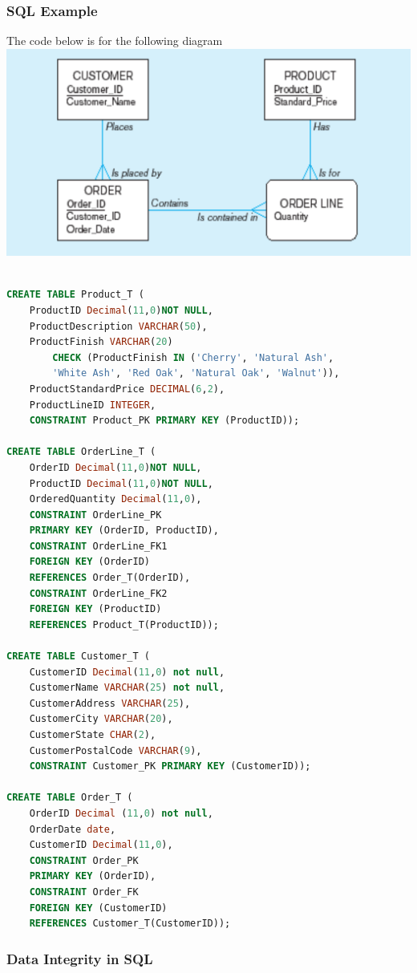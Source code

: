 \documentclass[12pt]{article}
\begin{document}
\subsubsection{SQL Example}

The code below is for the following diagram\\
\includegraphics[scale=0.55]{lec7-1}

\begin{lstlisting}[language=SQL]

CREATE TABLE Product_T (
	ProductID Decimal(11,0)NOT NULL, 
	ProductDescription VARCHAR(50), 
	ProductFinish VARCHAR(20)
		CHECK (ProductFinish IN ('Cherry', 'Natural Ash',
		'White Ash', 'Red Oak', 'Natural Oak', 'Walnut')),
	ProductStandardPrice DECIMAL(6,2), 
	ProductLineID INTEGER,
	CONSTRAINT Product_PK PRIMARY KEY (ProductID));

CREATE TABLE OrderLine_T (
	OrderID Decimal(11,0)NOT NULL, 
	ProductID Decimal(11,0)NOT NULL, 
	OrderedQuantity Decimal(11,0),
 	CONSTRAINT OrderLine_PK 
	PRIMARY KEY (OrderID, ProductID),
	CONSTRAINT OrderLine_FK1 
	FOREIGN KEY (OrderID) 
	REFERENCES Order_T(OrderID),
	CONSTRAINT OrderLine_FK2 
	FOREIGN KEY (ProductID) 
	REFERENCES Product_T(ProductID));

CREATE TABLE Customer_T (
	CustomerID Decimal(11,0) not null,
	CustomerName VARCHAR(25) not null, 
	CustomerAddress VARCHAR(25), 
	CustomerCity VARCHAR(20), 
	CustomerState CHAR(2), 
	CustomerPostalCode VARCHAR(9),
	CONSTRAINT Customer_PK PRIMARY KEY (CustomerID));

CREATE TABLE Order_T (
	OrderID Decimal (11,0) not null, 
	OrderDate date,
	CustomerID Decimal(11,0),
	CONSTRAINT Order_PK 
	PRIMARY KEY (OrderID),
  	CONSTRAINT Order_FK 
	FOREIGN KEY (CustomerID) 
	REFERENCES Customer_T(CustomerID));
\end{lstlisting}

\subsubsection{Data Integrity in SQL}
\end{document}
